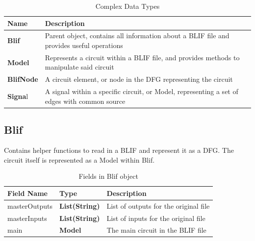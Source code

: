 \documentclass[12pt,final,oneside]{dwThesis} %
\begin{document}
   \begin{table}

      \begin{tabularx}
         {\linewidth}{lX} \toprule Name &
         Description\\
         \midrule
         \textbf{Blif} & Parent object, contains all information
         about a \gls{BLIF} file and provides useful operations \\
         \textbf{Model} &
         Represents a circuit within a \gls{BLIF} file, and provides methods to
         manipulate said circuit \\
         \textbf{BlifNode} & A circuit element, or node in
         the \gls{DFG} representing the circuit \\
         \textbf{Signa}l & A signal within a
         specific circuit, or Model, representing a set of edges with common
         source \\
         \bottomrule 
      \end{tabularx}
      \caption{Complex Data Types}\label{complexTypes}

   \end{table}



   \subsection{Blif}
   Contains helper functions to read in a \gls{BLIF} and
   represent it as a \gls{DFG}.  The circuit itself is represented as a Model
   within Blif.  
   \begin{table}

      \begin{tabularx}
         {\linewidth}{llX} \toprule Field
         Name & Type & Description\\
         \midrule masterOutputs &
         \textbf{List(String)} & List of outputs for the original file \\

         masterInputs & \textbf{List(String)} & List of inputs for the original
         file \\
         main & \textbf{Model} & The main circuit in the \gls{BLIF}
         file\\
         \bottomrule 
      \end{tabularx}
      \caption{Fields in Blif object}

   \end{table}
\end{document}
